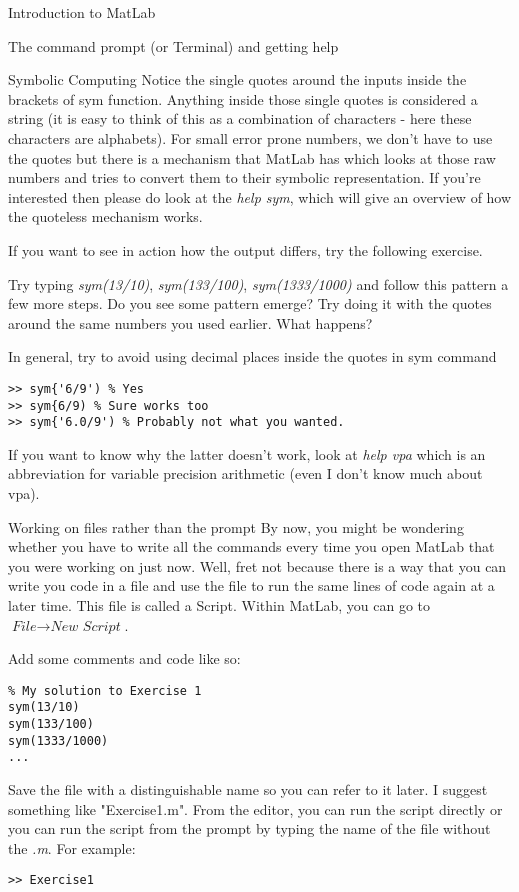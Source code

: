 \documentclass[11pt, oneside]{report}   	%
\begin{document}
\begin{chapter}{Introduction to MatLab}
\begin{section}{The command prompt (or Terminal) and getting help}
\begin{subsection}{Symbolic Computing}
Notice the single quotes around the inputs inside the brackets of sym function. Anything inside those single quotes is considered a string (it is easy to think of this as a combination of characters - here these characters are alphabets). For small error prone numbers, we don't have to use the quotes but there is a mechanism that MatLab has which looks at those raw numbers and tries to convert them to their symbolic representation. If you're interested then please do look at the \textit{help sym}, which will give an overview of how the quoteless mechanism works.

If you want to see in action how the output differs, try the following exercise.
\begin{Exercise}
Try typing \textit{sym(13/10)}, \textit{sym(133/100)}, \textit{sym(1333/1000)} and follow this pattern a few more steps. Do you see some pattern emerge? Try doing it with the quotes around the same numbers you used earlier. What happens?
\end{Exercise}

In general, try to avoid using decimal places inside the quotes in sym command

\begin{lstlisting}
>> sym{'6/9') % Yes
>> sym{6/9) % Sure works too
>> sym{'6.0/9') % Probably not what you wanted. 

\end{lstlisting}

If you want to know why the latter doesn't work, look at \textit{help vpa} which is an abbreviation for variable precision arithmetic (even I don't know much about vpa).

\end{subsection}

\begin{subsection}{Working on files rather than the prompt}
By now, you might be wondering whether you have to write all the commands every time you open MatLab that you were working on just now. Well, fret not because there is a way that you can write you code in a file and use the file to run the same lines of code again at a later time. This file is called a Script. Within MatLab, you can go to $\textit{File} \rightarrow \textit{New Script}$.

Add some comments and code like so:

\begin{lstlisting}
% My solution to Exercise 1
sym(13/10)
sym(133/100)
sym(1333/1000)
...
\end{lstlisting} 
Save the file with a distinguishable name so you can refer to it later. I suggest something like "Exercise1.m". From the editor, you can run the script directly or you can run the script from the prompt by typing the name of the file without the \textit{.m}. For example:
\begin{lstlisting}
>> Exercise1 
\end{lstlisting}


\end{subsection}
\end{section}
\end{chapter}
\end{document}
